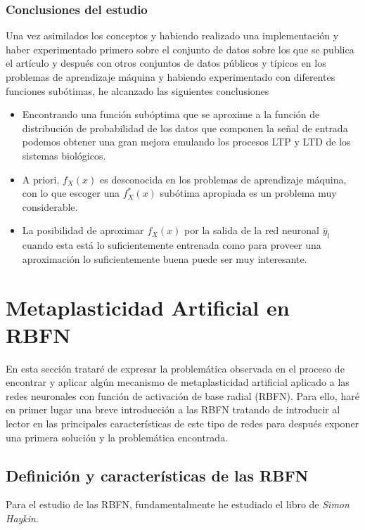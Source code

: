\documentclass[10pt,a4paper]{report}
\begin{document}
\subsubsection{Conclusiones del estudio}
Una vez asimilados los conceptos y habiendo realizado una implementación y haber experimentado primero sobre el conjunto de datos sobre los que se publica el artículo y después con otros conjuntos de datos públicos y típicos en los problemas de aprendizaje máquina y habiendo experimentado con diferentes funciones subótimas, he alcanzado las siguientes conclusiones
\begin{itemize}
	\item Encontrando una función subóptima que se aproxime a la función de distribución de probabilidad de los datos que componen la señal de entrada podemos obtener una gran mejora emulando los procesos LTP y LTD de los sistemas biológicos.
	\item A priori, $f_X(x)$ es desconocida en los problemas de aprendizaje máquina, con lo que escoger una $f^*_X(x)$ subótima apropiada es un problema muy considerable.
	\item La posibilidad de aproximar $f_X(x)$ por la salida de la red neuronal $\widehat{y}_l$ cuando esta está lo suficientemente entrenada como para proveer una aproximación lo suficientemente buena puede ser muy interesante.
\end{itemize}

\section{Metaplasticidad Artificial en RBFN}
En esta sección trataré de expresar la problemática observada en el proceso de encontrar y aplicar algún mecanismo de metaplasticidad artificial aplicado a las redes neuronales con función de activación de base radial (RBFN). Para ello, haré en primer lugar una breve introducción a las RBFN tratando de introducir al lector en las principales características de este tipo de redes para después exponer una primera solución y la problemática encontrada.
\subsection{Definición y características de las RBFN}
Para el estudio de las RBFN, fundamentalmente he estudiado el libro de \textit{Simon Haykin}\cite{haykin99a}. 
\end{document}
